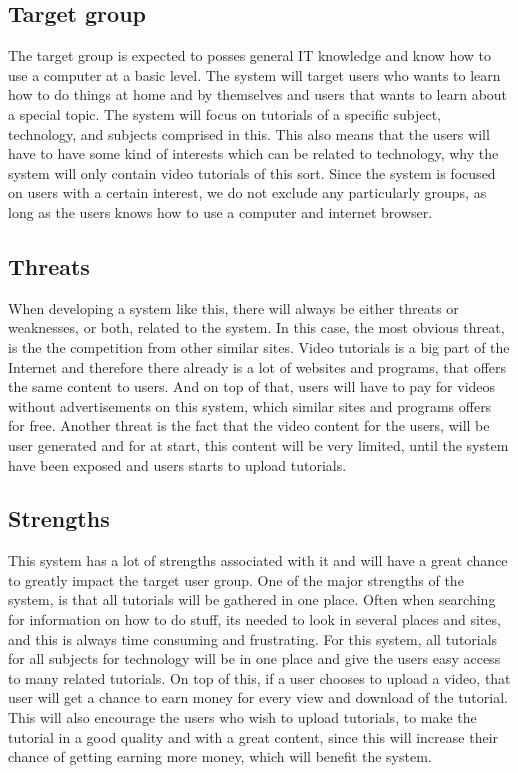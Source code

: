 \subsection{Target group}
The target group is expected to posses general IT knowledge and know how to use a computer at a basic level. The system will target users who wants to learn how to do things at home and by themselves and users that wants to learn about a special topic. The system will focus on tutorials of a specific subject, technology, and subjects comprised in this. This also means that the users will have to have some kind of interests which can be related to technology, why the system will only contain video tutorials of this sort. Since the system is focused on users with a certain interest, we do not exclude any particularly groups, as long as the users knows how to use a computer and internet browser.  

\subsection{Threats}
When developing a system like this, there will always be either threats or weaknesses, or both, related to the system. In this case, the most obvious threat, is the the competition from other similar sites. Video tutorials is a big part of the Internet and therefore there already is a lot of websites and programs, that offers the same content to users. And on top of that, users will have to pay for videos without advertisements on this system, which similar sites and programs offers for free. Another threat is the fact that the video content for the users, will be user generated and for at start, this content will be very limited, until the system have been exposed and users starts to upload tutorials.

\subsection{Strengths}
This system has a lot of strengths associated with it and will have a great chance to greatly impact the target user group. One of the major strengths of the system, is that all tutorials will be gathered in one place. Often when searching for information on how to do stuff, its needed to look in several places and sites, and this is always time consuming and frustrating. For this system, all tutorials for all subjects for technology will be in one place and give the users easy access to many related tutorials. On top of this, if a user chooses to upload a video, that user will get a chance to earn money for every view and download of the tutorial. This will also encourage the users who wish to upload tutorials, to make the tutorial in a good quality and with a great content, since this will increase their chance of getting earning more money, which will benefit the system.\\


